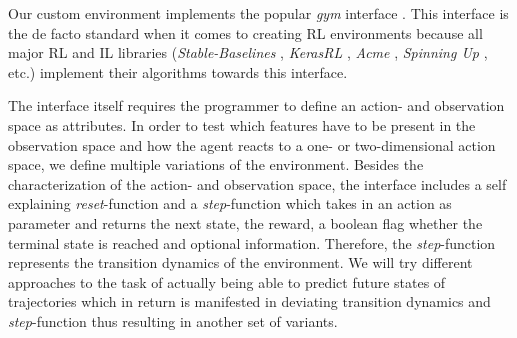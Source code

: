 Our custom environment implements the popular \textit{gym} interface \cite[]{gym}. This interface is the de facto standard when it comes to creating RL environments because all major RL and IL libraries (\textit{Stable-Baselines} \cite[]{stable-baselines3}, \textit{KerasRL} \cite[]{plappert2016kerasrl}, \textit{Acme} \cite[]{hoffman2020acme}, \textit{Spinning Up} \cite[]{SpinningUp2018}, etc.) implement their algorithms towards this interface.
\par
The interface itself requires the programmer to define an action- and observation space as attributes. In order to test which features have to be present in the observation space and how the agent reacts to a one- or two-dimensional action space, we define multiple variations of the environment. Besides the characterization of the action- and observation space, the interface includes a self explaining \textit{reset}-function and a \textit{step}-function which takes in an action as parameter and returns the next state, the reward, a boolean flag whether the terminal state is reached and optional information. Therefore, the \textit{step}-function represents the transition dynamics of the environment. We will try different approaches to the task of actually being able to predict future states of trajectories which in return is manifested in deviating transition dynamics and \textit{step}-function thus resulting in another set of variants.


